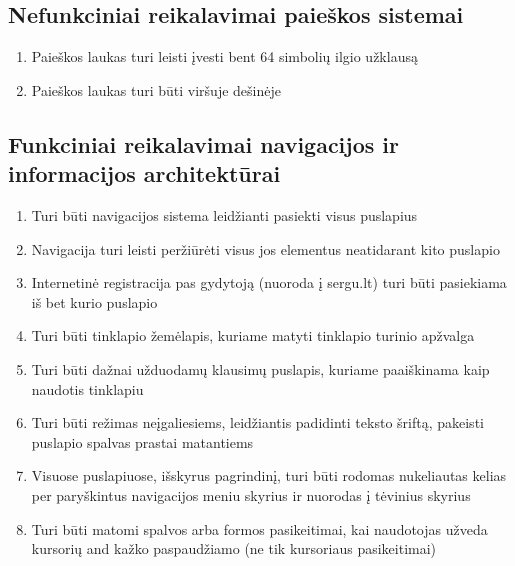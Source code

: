 \documentclass{VUMIFPSkursinis}
\begin{document}
\subsection{Nefunkciniai reikalavimai paieškos sistemai}
\begin{enumerate}
	\item Paieškos laukas turi leisti įvesti bent 64 simbolių ilgio užklausą
	\item Paieškos laukas turi būti viršuje dešinėje
\end{enumerate}

\subsection{Funkciniai reikalavimai navigacijos ir informacijos architektūrai}
\begin{enumerate}
	\item Turi būti navigacijos sistema leidžianti pasiekti visus puslapius
	\item Navigacija turi leisti peržiūrėti visus jos elementus neatidarant kito puslapio
	\item Internetinė registracija pas gydytoją (nuoroda į sergu.lt) turi būti pasiekiama iš bet kurio puslapio
	\item Turi būti tinklapio žemėlapis, kuriame matyti tinklapio turinio apžvalga
	\item Turi būti dažnai užduodamų klausimų puslapis, kuriame paaiškinama kaip naudotis tinklapiu
	\item Turi būti režimas neįgaliesiems, leidžiantis padidinti teksto šriftą, pakeisti puslapio spalvas prastai matantiems
	\item Visuose puslapiuose, išskyrus pagrindinį, turi būti rodomas nukeliautas kelias per paryškintus navigacijos meniu skyrius ir nuorodas į tėvinius skyrius
	\item Turi būti matomi spalvos arba formos pasikeitimai, kai naudotojas užveda kursorių and kažko paspaudžiamo (ne tik kursoriaus pasikeitimai)
\end{enumerate}
\end{document}
